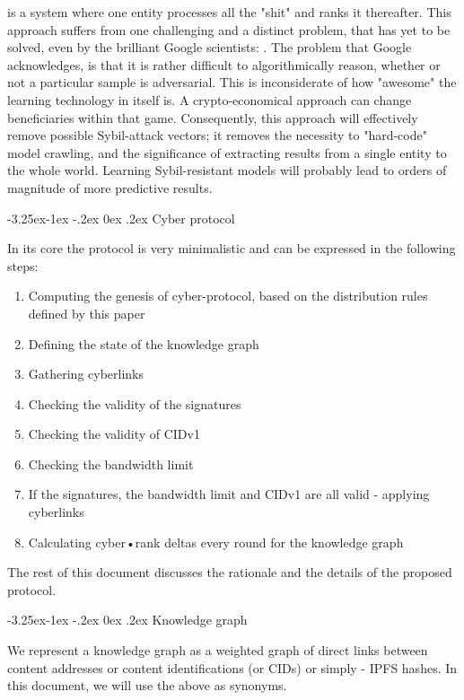 \documentclass[8pt,oneside]{amsart}
\makeatletter
\newcommand{\linkgreen}[2]{\href{#1}{\color{green}{#2}}}
\renewcommand\subsection{\@startsection{subsection}{2}{\z@}%
                                     {-3.25ex\@plus -1ex \@minus -.2ex}%
                                     {0ex \@plus .2ex}%
                                     {\play\Large}}%
\newcommand{\titleSection}[1]{\subsection{#1}}
\makeatother
\begin{document}
\begin{Abstract}
\linkgreen{https://ipfs.io/ipfs/QmeS4LjoL1iMNRGuyYSx78RAtubTT2bioSGnsvoaupcHR6}{The current architecture of search engines} is a system where one entity processes all the "shit" and ranks it thereafter. This approach suffers from one challenging and a distinct problem, that has yet to be solved, even by the brilliant Google scientists: \linkgreen{https://ipfs.io/ipfs/QmNrAFz34SLqkzhSg4wAYYJeokfJU5hBEpkT4hPRi226y9}{the adversarial example problem}. The problem that Google acknowledges, is that it is rather difficult to algorithmically reason, whether or not a particular sample is adversarial. This is inconsiderate of how "awesome" the learning technology in itself is. A crypto-economical approach can change beneficiaries within that game. Consequently, this approach will effectively remove possible Sybil-attack vectors; it removes the necessity to "hard-code" model crawling, and the significance of extracting results from a single entity to the whole world. Learning Sybil-resistant models will probably lead to orders of magnitude of more predictive results.

\titleSection{Cyber protocol}\label{Cyber protocol}

In its core the protocol is very minimalistic and can be expressed in the following steps:

\begin{enumerate}[nosep]
\item Computing the genesis of cyber-protocol, based on the distribution rules defined by this paper
\item Defining the state of the knowledge graph
\item Gathering cyberlinks
\item Checking the validity of the signatures
\item Checking the validity of CIDv1
\item Checking the bandwidth limit
\item If the signatures, the bandwidth limit and CIDv1 are all valid - applying cyberlinks
\item Calculating cyber•rank deltas every round for the knowledge graph
\end{enumerate}

The rest of this document discusses the rationale and the details of the proposed protocol.

\titleSection{Knowledge graph}\label{knowledge graph}

We represent a knowledge graph as a weighted graph of direct links between content addresses or content identifications (or CIDs) or simply - IPFS hashes. In this document, we will use the above as synonyms.


\end{Abstract}
\end{document}
